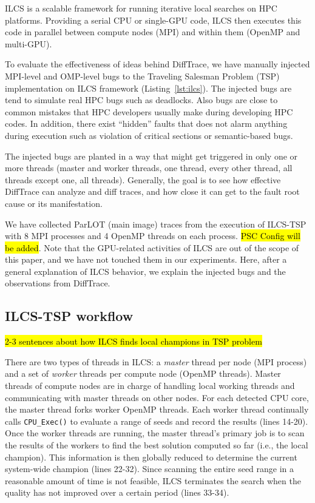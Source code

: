 
ILCS is a scalable framework for running iterative local searches on HPC platforms.
%
Providing a serial CPU or single-GPU code, ILCS then executes this code in parallel between compute nodes (MPI) and within them (OpenMP and multi-GPU).
%

To evaluate the effectiveness of ideas behind DiffTrace, we have manually injected MPI-level and OMP-level bugs to the Traveling Salesman Problem (TSP) implementation on ILCS framework (Listing~\ref{lst:ilcs}).
%
The injected bugs are tend to simulate real HPC bugs such as deadlocks.
%
Also bugs are close to common mistakes that HPC developers usually make during developing HPC codes.
%
In addition, there exist ``hidden'' faults that does not alarm anything during execution such as violation of critical sections or semantic-based bugs. 
%



The injected bugs are planted in a way that might get triggered in only one or more threads (master and worker threads, one thread, every other thread, all threads except one, all threads). 
%
Generally, the goal is to see how effective DiffTrace can analyze and diff traces, and how close it can get to the fault root cause or its manifestation. 

%
We have collected ParLOT (main image) traces from the execution of ILCS-TSP with 8 MPI processes and 4 OpenMP threads on each process. \hl{PSC Config will be added}. Note that the GPU-related activities of ILCS are out of the scope of this paper, and we have not touched them in our experiments.
Here, after a general explanation of ILCS behavior, we explain the injected bugs and the observations from DiffTrace.%


\subsection{ILCS-TSP workflow}

\hl{2-3 sentences about how ILCS finds local champions in TSP problem}

There are two types of threads in ILCS: a \textit{master} thread per node (MPI process) and a set of \textit{worker} threads per compute node (OpenMP threads).
%
Master threads of compute nodes are in charge of handling local working threads and communicating with master threads on other nodes.
%
For each detected CPU core, the master thread forks worker OpenMP threads.
%
Each worker thread continually calls
\texttt{CPU\_Exec()} to evaluate a range of seeds and record the results (lines 14-20).
%
Once the worker threads are running, the master thread's primary job is to scan the results of the workers to find the best solution computed so far (i.e., the local champion). This information is then globally reduced to determine the current system-wide champion (lines 22-32).
%
Since scanning the entire seed range in a reasonable amount of time is not feasible, ILCS terminates the search when the quality has not improved over a certain period (lines 33-34).

